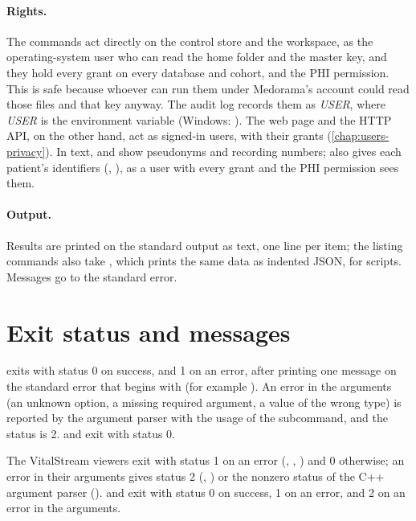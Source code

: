 \paragraph{Rights.} The commands act directly on the control store and the workspace, as the
operating-system user who can read the home folder and the master key, and they hold every grant
on every database and cohort, and the PHI permission. This is safe because whoever can run them
under Medorama's account could read those files and that key anyway. The audit log records them
as \textit{USER}, where \textit{USER} is the environment variable 
(Windows: ). The web page and the HTTP API, on the other hand, act as signed-in
users, with their grants (\cref{chap:users-privacy}). In text,  and
 show pseudonyms and recording numbers;  also gives each
patient's identifiers (, ), as a user with every grant and the PHI
permission sees them.

\paragraph{Output.} Results are printed on the standard output as text, one line per item; the
listing commands also take , which prints the same data as indented JSON, for
scripts. Messages go to the standard error.

\section{Exit status and messages}
\label{sec:cli-status}

 exits with status 0 on success, and 1 on an error, after printing one message on
the standard error that begins with  (for example
). An error in the arguments (an
unknown option, a missing required argument, a value of the wrong type) is reported by the
argument parser with the usage of the subcommand, and the status is 2.  and  exit
with status 0.

The VitalStream viewers exit with status 1 on an error (,
, ) and 0 otherwise; an error in their
arguments gives status 2 (, ) or the nonzero status of
the C++ argument parser ().  and  exit with
status 0 on success, 1 on an error, and 2 on an error in the arguments.

